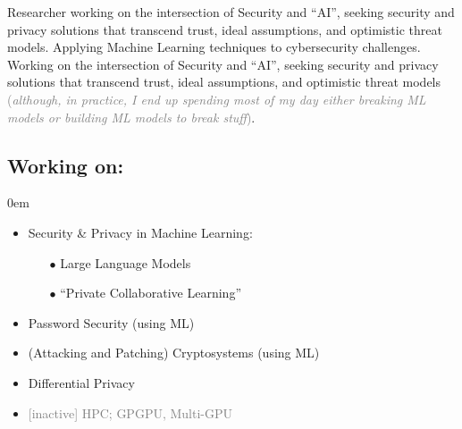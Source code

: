 \documentclass[margin, 10pt]{article} %
\begin{document}


 
\vspace{.2cm}
 \ifita
 \noindent Researcher working on the intersection of Security and ``AI'', seeking security and privacy solutions that transcend trust, ideal assumptions, and optimistic threat models. Applying Machine Learning techniques to cybersecurity challenges.
 \else
  \noindent Working on the intersection of Security and ``AI'', seeking security and privacy solutions that transcend trust, ideal assumptions, and optimistic threat models \textcolor{gray}{(\textit{although, in practice, I end up spending most of my day either breaking ML models or building ML models to break stuff})}.
 \fi
 

\subsection*{Working on:} 
\itemsep0em 
\begin{itemize}
\itemsep0em 
\item Security \& Privacy in Machine Learning:
	\begin{itemize}
	\item[$\bullet$] Large Language Models \cite{nes, llmmap, hackai}
		\item[$\bullet$]  ``Private Collaborative Learning'' \cite{dl, CCS21, CCS22}  		
	\end{itemize}
\item Password Security (using ML) \cite{uncm, SP21, adam}
\item (Attacking and Patching) Cryptosystems (using ML) \cite{MIGP, CCS22} 
\item Differential Privacy \cite{uncm}
\item \textcolor{gray}{[inactive]
 HPC; GPGPU, Multi-GPU \cite{MONOAMG}}
\end{itemize}
\end{document}
